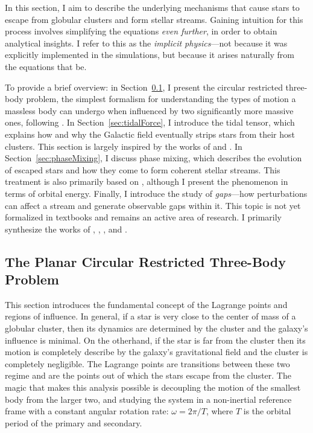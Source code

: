     In this section, I aim to describe the underlying mechanisms that cause stars to escape from globular clusters and form stellar streams. Gaining intuition for this process involves simplifying the equations \textit{even further}, in order to obtain analytical insights. I refer to this as the \textit{implicit physics}—not because it was explicitly implemented in the simulations, but because it arises naturally from the equations that be.

    To provide a brief overview: in Section~\ref{sec:thePlanarCircularRestrictedThreeBodyProblem}, I present the circular restricted three-body problem, the simplest formalism for understanding the types of motion a massless body can undergo when influenced by two significantly more massive ones, following \citet{koon2000dynamical}. In Section~\ref{sec:tidalForce}, I introduce the tidal tensor, which explains how and why the Galactic field eventually strips stars from their host clusters. This section is largely inspired by the works of \citet{2004AJ....127.2753D} and \citet{bovy_inprep}. In Section~\ref{sec:phaseMixing}, I discuss phase mixing, which describes the evolution of escaped stars and how they come to form coherent stellar streams. This treatment is also primarily based on \citet[see chatper 19.4 of][]{bovy_inprep}, although I present the phenomenon in terms of orbital energy. Finally, I introduce the study of \textit{gaps}—how perturbations can affect a stream and generate observable gaps within it. This topic is not yet formalized in textbooks and remains an active area of research. I primarily synthesize the works of \citet{2012ApJ...748...20C,2013ApJ...775...90C}, \citet{2015MNRAS.450.1136E}, \citet{2016PhRvL.116l1301B}, and \citet{2016MNRAS.457.3817S}.
    \subsection{The Planar Circular Restricted Three-Body Problem}\label{sec:thePlanarCircularRestrictedThreeBodyProblem}
        
        This section introduces the fundamental concept of the Lagrange points and regions of influence. In general, if a star is very close to the center of mass of a globular cluster, then its dynamics are determined by the cluster and the galaxy's influence is minimal. On the otherhand, if the star is far from the cluster then its motion is completely describe by the galaxy's gravitational field and the cluster is completely negligible. The Lagrange points are transitions between these two regime and are the points out of which the stars escape from the cluster. The magic that makes this analysis possible is decoupling the motion of the smallest body from the larger two, and studying the system in a non-inertial reference frame with a constant angular rotation rate: $\omega = 2\pi/T$, where $T$ is the orbital period of the primary and secondary. 

